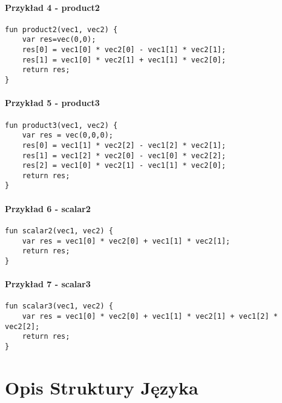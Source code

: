 \documentclass[11pt]{article} %
\begin{document}
\paragraph{Przykład 4 - product2}
\begin{verbatim}
fun product2(vec1, vec2) {
    var res=vec(0,0);
    res[0] = vec1[0] * vec2[0] - vec1[1] * vec2[1];
    res[1] = vec1[0] * vec2[1] + vec1[1] * vec2[0];
    return res;
}
\end{verbatim}

\paragraph{Przykład 5 - product3}
\begin{verbatim}
fun product3(vec1, vec2) {
    var res = vec(0,0,0);
    res[0] = vec1[1] * vec2[2] - vec1[2] * vec2[1];
    res[1] = vec1[2] * vec2[0] - vec1[0] * vec2[2];
    res[2] = vec1[0] * vec2[1] - vec1[1] * vec2[0];
    return res;
}
\end{verbatim}

\paragraph{Przykład 6 - scalar2}
\begin{verbatim}
fun scalar2(vec1, vec2) {
    var res = vec1[0] * vec2[0] + vec1[1] * vec2[1];
    return res;
}
\end{verbatim}

\paragraph{Przykład 7 - scalar3}
\begin{verbatim}
fun scalar3(vec1, vec2) {
    var res = vec1[0] * vec2[0] + vec1[1] * vec2[1] + vec1[2] * vec2[2];
    return res;
}
\end{verbatim}

\section{Opis Struktury Języka}
\end{document}
